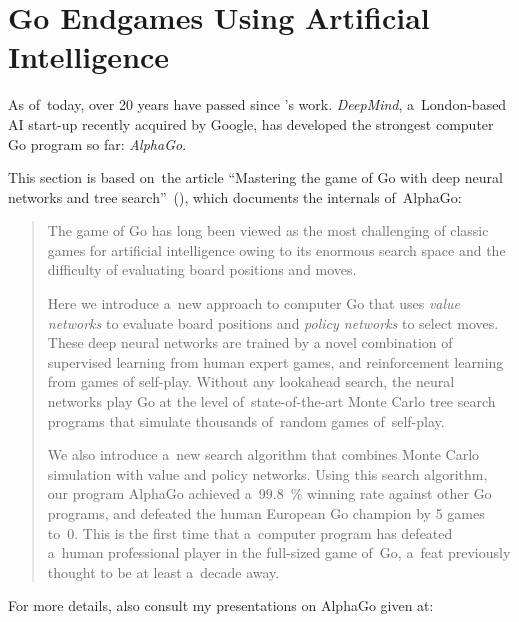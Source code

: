 \section{Go Endgames Using Artificial Intelligence}
\label{sec:AlphaGo}

As of~today, over 20 years have passed since \Mueller's work.
\emph{DeepMind}, a~London-based AI start-up recently acquired by Google, has developed the strongest computer Go program so far:
\emph{AlphaGo}.

This section is based on~the article ``Mastering the game of Go with deep neural networks and tree search''~(\cite{Silver2016mastering}), which documents the internals of~AlphaGo:

\begin{quotation}
  The game of Go has long been viewed as the most challenging of classic games for artificial intelligence owing to its enormous search space and the difficulty of evaluating board positions and moves.

  Here we introduce a~new approach to computer Go that uses \emph{value networks} to evaluate board positions and \emph{policy networks} to select moves.
  These deep neural networks are trained by a novel combination of supervised learning from human expert games, and reinforcement learning from games of self-play.
  Without any lookahead search, the neural networks play Go at the level of~state-of-the-art Monte Carlo tree search programs that simulate thousands of~random games of~self-play. 

  We also introduce a~new search algorithm that combines Monte Carlo simulation with value and policy networks.
  Using this search algorithm, our program AlphaGo achieved a~99.8~\% winning rate against other Go programs, and defeated the human European Go champion by 5 games to~0.
  This is the first time that a~computer program has defeated a~human professional player in the full-sized game of~Go, a~feat previously thought to be at least a~decade away.
\end{quotation}
For more details, also consult my presentations on AlphaGo given at:
